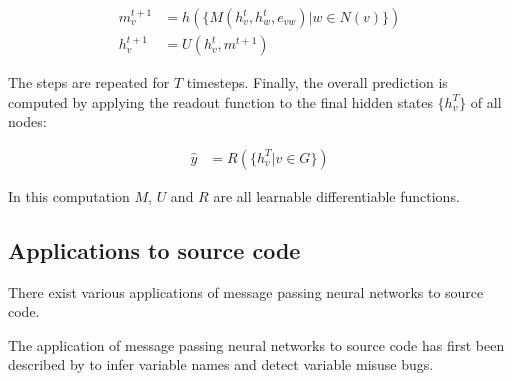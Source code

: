 \documentclass[sigconf,authordraft=true,nonacm=true]{acmart}
\begin{document}
\begin{align}
  m^{t+1}_{v} & = h(\{M(h^{t}_{v},h^{t}_{w},e_{vw}) | w \in N(v)\}) \label{eq:msg} \\
  h^{t+1}_{v} & = U(h^{t}_{v}, m^{t+1}) \label{eq:update}
\end{align}

The steps are repeated for $T$ timesteps. Finally, the overall prediction is computed by applying the readout function to the final hidden states $\{h^{T}_{v}\}$ of all nodes:

\begin{align}
  \hat{y} &= R(\{h^{T}_{v} | v \in G\}) \label{eq:readout}
\end{align}

In this computation $M$, $U$ and $R$ are all learnable differentiable functions.

\begin{figure}
  \begin{tikzpicture}
  \end{tikzpicture}
\end{figure}

\subsection{Applications to source code}\label{sec:app}
There exist various applications of message passing neural networks to source code.

The application of message passing neural networks to source code has first been described by \citet{allamanis_learning_2018} to infer variable names and detect variable misuse bugs.
\end{document}
